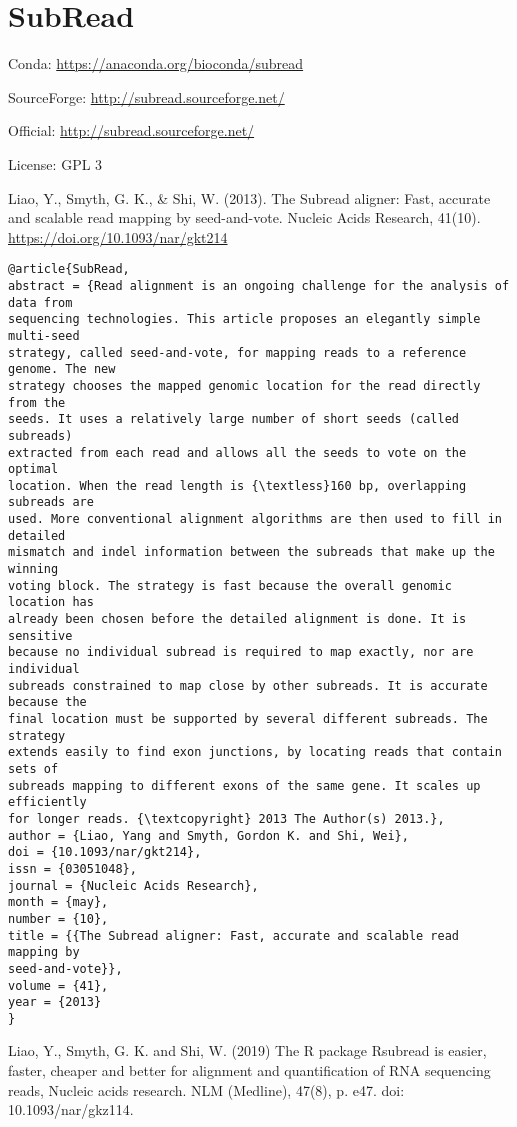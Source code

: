 \documentclass[]{article}
\begin{document}
\section{SubRead}

Conda: \url{https://anaconda.org/bioconda/subread}

SourceForge: \url{http://subread.sourceforge.net/}

Official: \url{http://subread.sourceforge.net/}

License: GPL 3



Liao, Y., Smyth, G. K., \& Shi, W. (2013). The Subread aligner: Fast, accurate and scalable read mapping by seed-and-vote. Nucleic Acids Research, 41(10). \url{https://doi.org/10.1093/nar/gkt214}


\begin{verbatim}
@article{SubRead,
abstract = {Read alignment is an ongoing challenge for the analysis of data from
sequencing technologies. This article proposes an elegantly simple multi-seed
strategy, called seed-and-vote, for mapping reads to a reference genome. The new
strategy chooses the mapped genomic location for the read directly from the
seeds. It uses a relatively large number of short seeds (called subreads)
extracted from each read and allows all the seeds to vote on the optimal
location. When the read length is {\textless}160 bp, overlapping subreads are
used. More conventional alignment algorithms are then used to fill in detailed
mismatch and indel information between the subreads that make up the winning
voting block. The strategy is fast because the overall genomic location has
already been chosen before the detailed alignment is done. It is sensitive
because no individual subread is required to map exactly, nor are individual
subreads constrained to map close by other subreads. It is accurate because the
final location must be supported by several different subreads. The strategy
extends easily to find exon junctions, by locating reads that contain sets of
subreads mapping to different exons of the same gene. It scales up efficiently
for longer reads. {\textcopyright} 2013 The Author(s) 2013.},
author = {Liao, Yang and Smyth, Gordon K. and Shi, Wei},
doi = {10.1093/nar/gkt214},
issn = {03051048},
journal = {Nucleic Acids Research},
month = {may},
number = {10},
title = {{The Subread aligner: Fast, accurate and scalable read mapping by
seed-and-vote}},
volume = {41},
year = {2013}
}
\end{verbatim}


Liao, Y., Smyth, G. K. and Shi, W. (2019) The R package Rsubread is easier, faster, cheaper and better for alignment and quantification of RNA sequencing reads, Nucleic acids research. NLM (Medline), 47(8), p. e47. doi: 10.1093/nar/gkz114.
\end{document}
